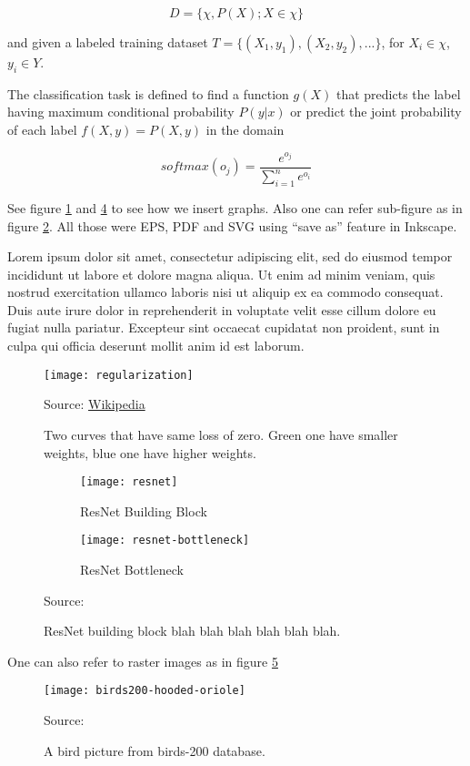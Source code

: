 \begin{equation}\label{eq:domain}
D = \{ \chi , P(X) ; X \in \chi \}
\end{equation}

and given a labeled training dataset \( T = \{ (X_1, y_1), (X_2, y_2), ... \} \),
for \( X_i \in \chi \), \( y_i \in Y \).

The classification task is defined\autocite{pan2010survey} to find a function \( g(X) \) that predicts the label
having maximum conditional probability \( P(y|x) \) 
or predict the joint probability of each label \( f(X,y) = P(X,y) \) in the domain

\begin{equation}
softmax(o_j) = \frac{e^{o_j}}{ \sum\limits_{i=1}^n e^{o_i} }
\label{eq:softmax}
\end{equation}

See figure \ref{fig:regularization} and \ref{fig:resnet} to see how we insert graphs.
Also one can refer sub-figure as in figure \ref{fig:resnet-block}.
All those were EPS, PDF and SVG using ``save as'' feature in Inkscape.


Lorem ipsum dolor sit amet, consectetur adipiscing elit,
sed do eiusmod tempor incididunt ut labore et dolore magna aliqua.
Ut enim ad minim veniam, quis nostrud exercitation ullamco laboris nisi ut aliquip ex ea commodo consequat.
Duis aute irure dolor in reprehenderit in voluptate velit esse cillum dolore eu fugiat nulla pariatur.
Excepteur sint occaecat cupidatat non proident, sunt in culpa qui officia deserunt mollit anim id est laborum.

\begin{figure}[!h]
\centering
\texttt{[image: regularization]}
\caption{Two curves that have same loss of zero. Green one have smaller weights, blue one have higher weights. }\label{fig:regularization}
{Source: \href{https://commons.wikimedia.org/wiki/File:Regularization.svg}{Wikipedia}\hfill}
\end{figure}


\begin{figure}[!h]
\centering
    \begin{subfigure}[b]{0.4\textwidth}
        \texttt{[image: resnet]}
        \caption{ResNet Building Block}\label{fig:resnet-block}
    \end{subfigure}
    \begin{subfigure}[b]{0.4\textwidth}
        \texttt{[image: resnet-bottleneck]}
        \caption{ResNet Bottleneck}\label{fig:resnet-bottleneck}
    \end{subfigure}
\caption{ResNet building block blah blah blah blah blah blah.}\label{fig:resnet}
{Source: \autocite{he2016deep}\hfill}
\end{figure}


One can also refer to raster images as in figure \ref{fig:birds200}

\begin{figure}[!h]
\centering
\texttt{[image: birds200-hooded-oriole]}
\caption{A bird picture from birds-200 database.}\label{fig:birds200}
{Source: \autocite{WahCUB_200_2011}\hfill}
\end{figure}
